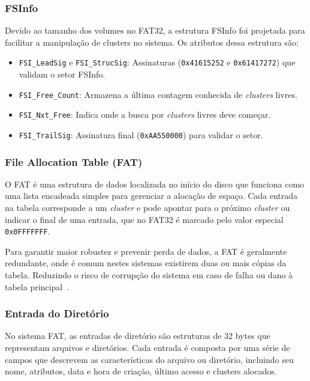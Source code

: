 \documentclass[
    12pt,				%
    oneside,   	        %
    a4paper,			%
    english,			%
    french,				%
    spanish,			%
    brazil,				%
    ]{pacotes/abntex2}
\begin{document}
\subsubsection{FSInfo}
\label{subsubsec:fsinfo}

Devido ao tamanho dos volumes no FAT32, a estrutura FSInfo foi projetada para facilitar a manipulação de clusters no sistema. Os atributos dessa estrutura são:

\begin{itemize}
    \item \texttt{FSI\_LeadSig} e \texttt{FSI\_StrucSig}: Assinaturas (\texttt{0x41615252} e \texttt{0x61417272}) que validam o setor FSInfo.
    \item \texttt{FSI\_Free\_Count}: Armazena a última contagem conhecida de \textit{clusters} livres.
    \item \texttt{FSI\_Nxt\_Free}: Indica onde a busca por \textit{clusters} livres deve começar.
    \item \texttt{FSI\_TrailSig}: Assinatura final (\texttt{0xAA550000}) para validar o setor.
\end{itemize}

\subsubsection{File Allocation Table (FAT)}
\label{subsubsec:fat}

O FAT é uma estrutura de dados localizada no início do disco que funciona como uma lista encadeada simples para gerenciar a alocação de espaço. Cada entrada na tabela corresponde a um \textit{cluster} e pode apontar para o próximo \textit{cluster} ou indicar o final de uma entrada, que no FAT32 é marcado pelo valor especial \texttt{0x0FFFFFFF}.

Para garantir maior robustez e prevenir perda de dados, a FAT é geralmente redundante, onde é comum nestes sistemas existirem duas ou mais cópias da tabela. Reduzindo o risco de corrupção do sistema em caso de falha ou dano à tabela principal~\cite{microsoft2000}.

\subsubsection{Entrada do Diretório}
\label{subsubsec:dentry}

No sistema FAT, as entradas de diretório são estruturas de 32 bytes que representam arquivos e diretórios. Cada entrada é composta por uma série de campos que descrevem as características do arquivo ou diretório, incluindo seu nome, atributos, data e hora de criação, último acesso e clusters alocados.
\end{document}
